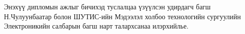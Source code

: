 
\begin{acknowledgements}
\addchaptertocentry{\acknowledgementname}

Энэхүү дипломын ажлыг бичихэд туслалцаа үзүүлсэн удирдагч багш \\
Н.Чулуунбаатар болон ШУТИС-ийн Мэдээлэл холбоо технологийн сургуулийн Электроникийн салбарын багш нарт талархсанаа илэрхийлье. 


\end{acknowledgements}

